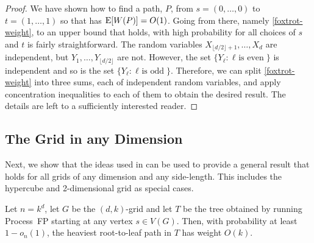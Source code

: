 \documentclass{patmorin}
\begin{document}
\begin{proof}
  We have shown how to find a path, $P$, from $s=(0,\ldots,0)$ to
  $t=(1,\ldots,1)$ so that has $\mathrm{E}[W(P)]=O(1)$.  Going from there,
  namely \eqref{foxtrot-weight}, to an upper bound that holds, with high
  probability for all choices of $s$ and $t$ is fairly straightforward.
  The random variables $X_{\lfloor d/2\rfloor+1},\ldots,X_d$ are
  independent, but $Y_1,\ldots,Y_{\lfloor d/2\rfloor}$ are not. However,
  the set $\{Y_\ell : \mbox{$\ell$ is even} \}$ is independent and so is
  the set $\{Y_\ell : \mbox{$\ell$ is odd} \}$.  Therefore, we can split
  \eqref{foxtrot-weight} into three sums, each of independent random
  variables, and apply concentration inequalities to each of them to
  obtain the desired result. The details are left to a sufficiently
  interested reader.
\end{proof}

\subsection{The Grid in any Dimension}

Next, we show that the ideas used in 
can be used to provide a general result that holds for all grids of
any dimension and any side-length.  This includes the hypercube and
2-dimensional grid as special cases.

\begin{thm}
   Let $n=k^d$, let $G$ be the $(d,k)$-grid
   and let $T$ be the tree obtained by running Process~FP starting at
   any vertex $s\in V(G)$.  Then, with probability at least $1-o_n(1)$,
   the heaviest root-to-leaf path in $T$ has weight $O(k)$.
\end{thm}
\end{document}
